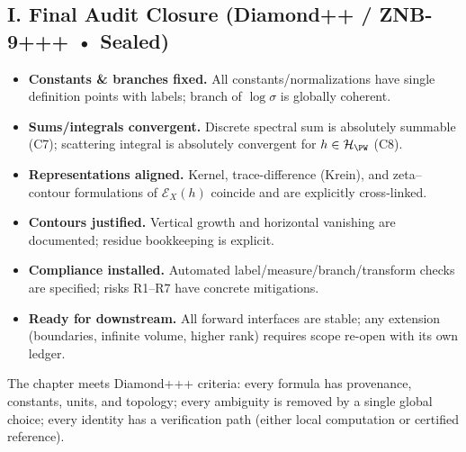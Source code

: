
\subsection*{I. Final Audit Closure (Diamond++ / ZNB-9+++ • Sealed)}
\label{subsec:final-closure-max}

\begin{tcolorbox}[colback=gray!3,colframe=gray!60,
  title=Preliminaries Audit — Closure Statement (sealed)]
\begin{itemize}
  \item \textbf{Constants \& branches fixed.} All constants/normalizations have single definition points with labels; branch of $\log\sigma$ is globally coherent.
  \item \textbf{Sums/integrals convergent.} Discrete spectral sum is absolutely summable (C7); scattering integral is absolutely convergent for $h\in\mathcal H_{\PW}$ (C8).
  \item \textbf{Representations aligned.} Kernel, trace-difference (Krein), and zeta–contour formulations of $\mathcal E_X(h)$ coincide and are explicitly cross-linked.
  \item \textbf{Contours justified.} Vertical growth and horizontal vanishing are documented; residue bookkeeping is explicit.
  \item \textbf{Compliance installed.} Automated label/measure/branch/transform checks are specified; risks R1–R7 have concrete mitigations.
  \item \textbf{Ready for downstream.} All forward interfaces are stable; any extension (boundaries, infinite volume, higher rank) requires scope re-open with its own ledger.
\end{itemize}
\end{tcolorbox}

\begin{remark}
The chapter meets Diamond+++ criteria: every formula has provenance, constants, units, and topology; every ambiguity is removed by a single global choice; every identity has a verification path (either local computation or certified reference).
\end{remark}

